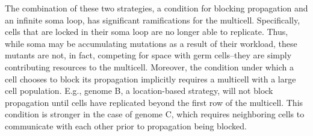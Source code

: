 The combination of these two strategies, a condition for blocking propagation and an infinite soma loop, has significant ramifications for the multicell.  Specifically, cells that are locked in their soma loop are no longer able to replicate.  Thus, while soma may be accumulating mutations as a result of their workload, these mutants are not, in fact, competing for space with germ cells--they are simply contributing resources to the multicell.  Moreover, the condition under which a cell chooses to block its propagation implicitly requires a multicell with a large cell population.  E.g., genome B, a location-based strategy, will not block propagation until cells have replicated beyond the first row of the multicell.  This condition is stronger in the case of genome C, which requires neighboring cells to communicate with each other prior to propagation being blocked.